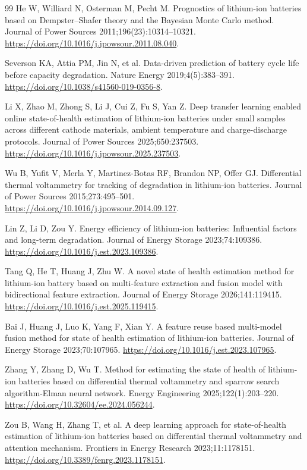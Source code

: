\begin{thebibliography}{99}
 He W, Williard N, Osterman M, Pecht M. Prognostics of lithium-ion batteries based on Dempster–Shafer theory and the Bayesian Monte Carlo method. Journal of Power Sources 2011;196(23):10314–10321. \url{https://doi.org/10.1016/j.jpowsour.2011.08.040}.

 Severson KA, Attia PM, Jin N, et al. Data-driven prediction of battery cycle life before capacity degradation. Nature Energy 2019;4(5):383–391. \url{https://doi.org/10.1038/s41560-019-0356-8}.

 Li X, Zhao M, Zhong S, Li J, Cui Z, Fu S, Yan Z. Deep transfer learning enabled online state-of-health estimation of lithium-ion batteries under small samples across different cathode materials, ambient temperature and charge-discharge protocols. Journal of Power Sources 2025;650:237503. \url{https://doi.org/10.1016/j.jpowsour.2025.237503}.

 Wu B, Yufit V, Merla Y, Martinez-Botas RF, Brandon NP, Offer GJ. Differential thermal voltammetry for tracking of degradation in lithium-ion batteries. Journal of Power Sources 2015;273:495–501. \url{https://doi.org/10.1016/j.jpowsour.2014.09.127}.

 Lin Z, Li D, Zou Y. Energy efficiency of lithium-ion batteries: Influential factors and long-term degradation. Journal of Energy Storage 2023;74:109386. \url{https://doi.org/10.1016/j.est.2023.109386}.

 Tang Q, He T, Huang J, Zhu W. A novel state of health estimation method for lithium-ion battery based on multi-feature extraction and fusion model with bidirectional feature extraction. Journal of Energy Storage 2026;141:119415. \url{https://doi.org/10.1016/j.est.2025.119415}.

 Bai J, Huang J, Luo K, Yang F, Xian Y. A feature reuse based multi-model fusion method for state of health estimation of lithium-ion batteries. Journal of Energy Storage 2023;70:107965. \url{https://doi.org/10.1016/j.est.2023.107965}.

 Zhang Y, Zhang D, Wu T. Method for estimating the state of health of lithium-ion batteries based on differential thermal voltammetry and sparrow search algorithm-Elman neural network. Energy Engineering 2025;122(1):203–220. \url{https://doi.org/10.32604/ee.2024.056244}.

 Zou B, Wang H, Zhang T, et al. A deep learning approach for state-of-health estimation of lithium-ion batteries based on differential thermal voltammetry and attention mechanism. Frontiers in Energy Research 2023;11:1178151. \url{https://doi.org/10.3389/fenrg.2023.1178151}.


\end{thebibliography}
